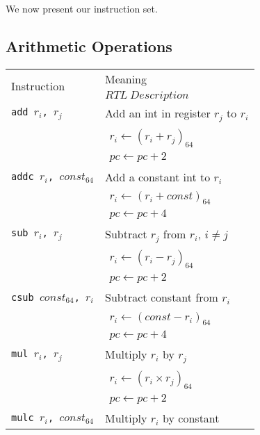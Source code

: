 		We now present our instruction set.
		\subsection{Arithmetic Operations}
		
		\begin{longtable}{|p{10em}|p{30em}|}
			\hline
			\multirow{2}{*}{Instruction} & Meaning \\
			& $RTL~Description$ \\
			\hline
			\texttt{add $r_i$, $r_j$} & Add an int in register $r_j$ to $r_i$ \\
			& $\begin{array}{lcl} 
			r_i \leftarrow (r_i + r_j)_{64} \\
			pc \leftarrow pc + 2  
			\end{array}$ \\
			\hline 
			\texttt{addc $r_i$, $const_{64}$} & Add a constant int to $r_i$ \\
			& $\begin{array}{lcl} 
			r_i \leftarrow (r_i + const)_{64} \\
			pc \leftarrow pc + 4  
			\end{array}$ \\
			\hline 
			\texttt{sub $r_i$, $r_j$} & Subtract $r_j$ from $r_i$, $i\neq j$ \\
			& $\begin{array}{lcl} 
			r_i \leftarrow (r_i - r_j)_{64} \\
			pc \leftarrow pc + 2  
			\end{array}$ \\
			\hline 
			\texttt{csub $const_{64}$, $r_i$} & Subtract constant from $r_i$ \\
			& $\begin{array}{lcl} 
			r_i \leftarrow (const - r_i)_{64} \\
			pc \leftarrow pc + 4
			\end{array}$ \\
			\hline 
			\texttt{mul $r_i$, $r_j$} & Multiply $r_i$ by $r_j$ \\
			& $\begin{array}{lcl} 
			r_i \leftarrow (r_i \times r_j)_{64} \\
			pc \leftarrow pc + 2
			\end{array}$ \\
			\hline 
			\texttt{mulc $r_i$, $const_{64}$} & Multiply $r_i$ by constant \\

\end{longtable}
